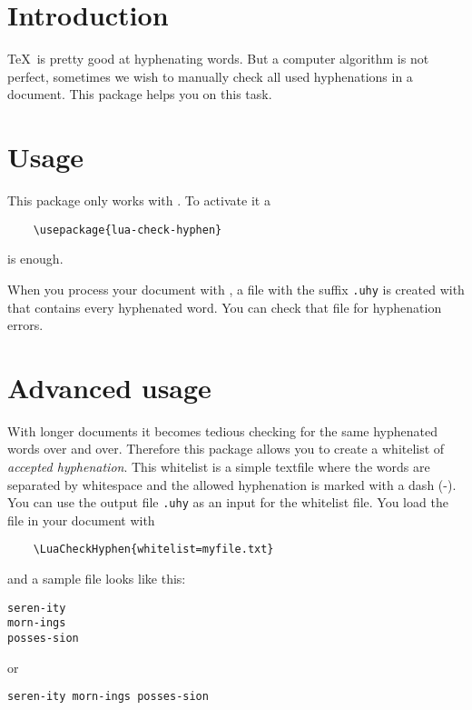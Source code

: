 \documentclass{ltxdockit}
\begin{document}
\printtitlepage
\tableofcontents

\section{Introduction}

\TeX\ is pretty good at hyphenating words. But a computer algorithm is not perfect, sometimes we wish to manually check all used hyphenations in a document. This package helps you on this task.

\section{Usage}

This package only works with \LuaTeX. To activate it a

\begin{verbatim}
	\usepackage{lua-check-hyphen}
\end{verbatim}
is enough.

When you process your document with \LuaLaTeX, a file with the suffix \verb|.uhy| is created with that contains every hyphenated word. You can check that file for hyphenation errors.

\section{Advanced usage}
\label{sec:advanced_usage}

With longer documents it becomes tedious checking for the same hyphenated words over and over. Therefore this package allows you to create a whitelist of \emph{accepted hyphenation}. This whitelist is a simple textfile where the words are separated by whitespace and the allowed hyphenation is marked with a dash (-). You can use the output file \texttt{.uhy} as an input for the whitelist file. You load the file in your document with

\begin{verbatim}
	\LuaCheckHyphen{whitelist=myfile.txt}
\end{verbatim}

and a sample file looks like this:

\begin{verbatim}
seren-ity
morn-ings
posses-sion
\end{verbatim}

or

\begin{verbatim}
seren-ity morn-ings posses-sion
\end{verbatim}
\end{document}

